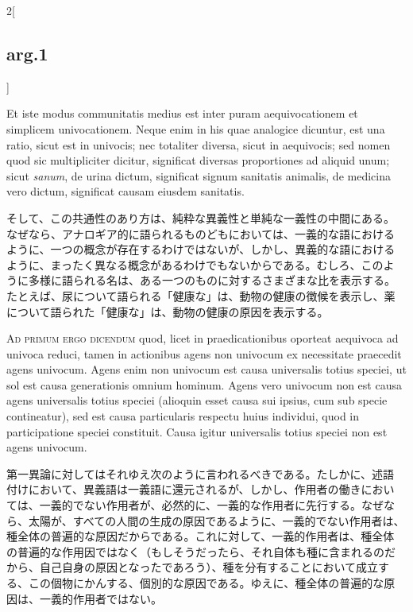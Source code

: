 \documentclass[paper=a4paper,fontsize=10pt,jafontsize=9pt,titlepage]{jlreq}
\begin{document}
\begin{paracol}{2}[\subsection{arg.1}]
\switchcolumn*

Et iste modus communitatis medius est inter puram aequivocationem et
simplicem univocationem. Neque enim in his quae analogice dicuntur,
est una ratio, sicut est in univocis; nec totaliter diversa, sicut in
aequivocis; sed nomen quod sic multipliciter dicitur, significat
diversas proportiones ad aliquid unum; sicut {\itshape sanum}, de urina
dictum, significat signum sanitatis animalis, de medicina vero dictum,
significat causam eiusdem sanitatis.

\switchcolumn

そして、この共通性のあり方は、純粋な異義性と単純な一義性の中間にある。
なぜなら、アナロギア的に語られるものどもにおいては、一義的な語における
ように、一つの概念が存在するわけではないが、しかし、異義的な語における
ように、まったく異なる概念があるわけでもないからである。むしろ、このよ
うに多様に語られる名は、ある一つのものに対するさまざまな比を表示する。
たとえば、尿について語られる「健康な」は、動物の健康の徴候を表示し、薬
について語られた「健康な」は、動物の健康の原因を表示する。

\switchcolumn*[\subsection{ad.1}]

{\scshape Ad primum ergo dicendum} quod, licet in praedicationibus oporteat
aequivoca ad univoca reduci, tamen in actionibus agens non univocum ex
necessitate praecedit agens univocum. Agens enim non univocum est
causa universalis totius speciei, ut sol est causa generationis omnium
hominum. Agens vero univocum non est causa agens universalis totius
speciei (alioquin esset causa sui ipsius, cum sub specie contineatur),
sed est causa particularis respectu huius individui, quod in
participatione speciei constituit.  Causa igitur universalis totius
speciei non est agens univocum.

\switchcolumn

第一異論に対してはそれゆえ次のように言われるべきである。たしかに、述語
付けにおいて、異義語は一義語に還元されるが、しかし、作用者の働きにおい
ては、一義的でない作用者が、必然的に、一義的な作用者に先行する。なぜな
ら、太陽が、すべての人間の生成の原因であるように、一義的でない作用者は、
種全体の普遍的な原因だからである。これに対して、一義的作用者は、種全体
の普遍的な作用因ではなく（もしそうだったら、それ自体も種に含まれるのだ
から、自己自身の原因となったであろう）、種を分有することにおいて成立す
る、この個物にかんする、個別的な原因である。ゆえに、種全体の普遍的な原
因は、一義的作用者ではない。


\end{paracol}
\end{document}
